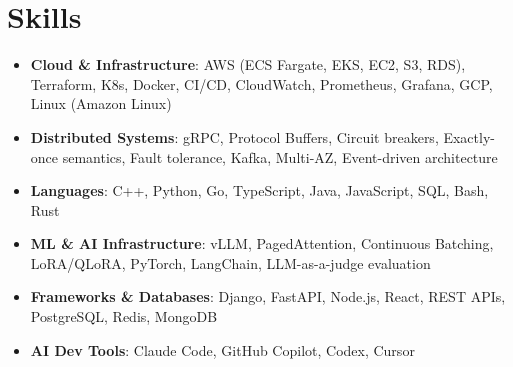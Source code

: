 \documentclass[letterpaper,11pt]{article}
\newcommand{\resumeSubHeadingListStart}{\begin{itemize}[leftmargin=0.15in, label={}]}
\newcommand{\resumeSubHeadingListEnd}{\end{itemize}}
\newcommand{\resumeSkillHeading}[2]{%
  \item\small{\textbf{#1}: #2 \vspace{-9pt}}%
}
\begin{document}
\section{Skills}
  \resumeSubHeadingListStart
    \resumeSkillHeading{Cloud \& Infrastructure}{AWS (ECS Fargate, EKS, EC2, S3, RDS), Terraform, K8s, Docker, CI/CD, CloudWatch, Prometheus, Grafana, GCP, Linux (Amazon Linux)}
    \resumeSkillHeading{Distributed Systems}{gRPC, Protocol Buffers, Circuit breakers, Exactly-once semantics, Fault tolerance, Kafka, Multi-AZ, Event-driven architecture}
    \resumeSkillHeading{Languages}{C++, Python, Go, TypeScript, Java, JavaScript, SQL, Bash, Rust}
    \resumeSkillHeading{ML \& AI Infrastructure}{vLLM, PagedAttention, Continuous Batching, LoRA/QLoRA, PyTorch, LangChain, LLM-as-a-judge evaluation}
    \resumeSkillHeading{Frameworks \& Databases}{Django, FastAPI, Node.js, React, REST APIs, PostgreSQL, Redis, MongoDB}
    \resumeSkillHeading{AI Dev Tools}{Claude Code, GitHub Copilot, Codex, Cursor}
  \resumeSubHeadingListEnd
\end{document}
